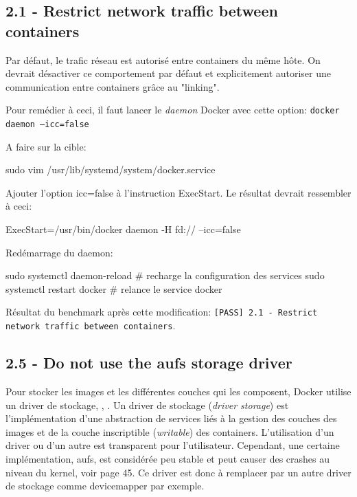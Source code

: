 \documentclass[11pt,a4paper,oneside]{report}
\newcommand{\code}[1]{\texttt{#1}}
\begin{document}
\subsection{2.1  - Restrict network traffic between containers}
Par défaut, le trafic réseau est autorisé entre containers du même hôte. On devrait désactiver ce comportement par défaut et explicitement autoriser une communication entre containers grâce au "linking".

Pour remédier à ceci, il faut lancer le \textit{daemon} Docker avec cette option: \code{docker daemon --icc=false}

A faire sur la cible:

\begin{bashcode}
sudo vim /usr/lib/systemd/system/docker.service
\end{bashcode}

Ajouter l'option icc=false à l'instruction ExecStart. Le résultat devrait ressembler à ceci:

\begin{bashcode}
ExecStart=/usr/bin/docker daemon -H fd:// --icc=false
\end{bashcode}

Redémarrage du daemon:

\begin{bashcode}
sudo systemctl daemon-reload # recharge la configuration des services
sudo systemctl restart docker # relance le service docker
\end{bashcode}

Résultat du benchmark après cette modification: \code{[PASS] 2.1 - Restrict network traffic between containers}.

\subsection{2.5 - Do not use the aufs storage driver}
Pour stocker les images et les différentes couches qui les composent, Docker utilise un driver de stockage\cite{understanding_image_container_driver_storage}, \cite{docker_select_a_driver}, \cite{jpetazzoni_device_driver}. Un driver de stockage (\textit{driver storage}) est l'implémentation d'une abstraction de services liés à la gestion des couches des images et de la couche inscriptible (\textit{writable}) des containers. L'utilisation d'un driver ou d'un autre est transparent pour l'utilisateur. Cependant, une certaine implémentation, aufs, est considérée peu stable et peut causer des crashes au niveau du kernel, voir \cite{cis_benchmark} page 45. Ce driver est donc à remplacer par un autre driver de stockage comme devicemapper par exemple.
\end{document}

